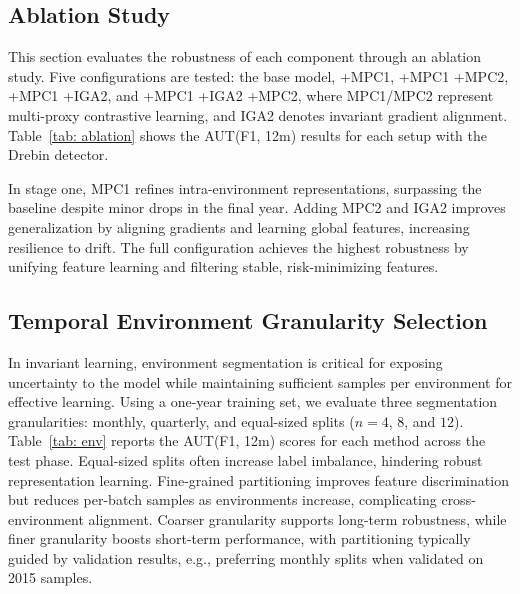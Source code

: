 \subsection{Ablation Study}
This section evaluates the robustness of each component through an ablation study. Five configurations are tested: the base model, +MPC1, +MPC1 +MPC2, +MPC1 +IGA2, and +MPC1 +IGA2 +MPC2, where MPC1/MPC2 represent multi-proxy contrastive learning, and IGA2 denotes invariant gradient alignment. Table~\ref{tab: ablation} shows the AUT(F1, 12m) results for each setup with the Drebin detector.

In stage one, MPC1 refines intra-environment representations, surpassing the baseline despite minor drops in the final year. Adding MPC2 and IGA2 improves generalization by aligning gradients and learning global features, increasing resilience to drift. The full configuration achieves the highest robustness by unifying feature learning and filtering stable, risk-minimizing features.





\subsection{Temporal Environment Granularity Selection}
\label{env seg}
In invariant learning, environment segmentation is critical for exposing uncertainty to the model while maintaining sufficient samples per environment for effective learning. Using a one-year training set, we evaluate three segmentation granularities: monthly, quarterly, and equal-sized splits ($n=4$, $8$, and $12$). Table~\ref{tab: env} reports the AUT(F1, 12m) scores for each method across the test phase. Equal-sized splits often increase label imbalance, hindering robust representation learning. Fine-grained partitioning improves feature discrimination but reduces per-batch samples as environments increase, complicating cross-environment alignment. Coarser granularity supports long-term robustness, while finer granularity boosts short-term performance, with partitioning typically guided by validation results, e.g., preferring monthly splits when validated on 2015 samples.
